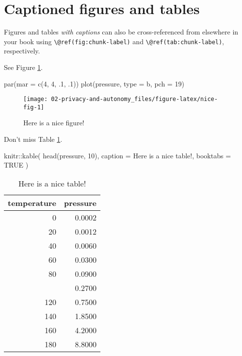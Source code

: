 \documentclass[
]{book}
\newenvironment{Shaded}{\begin{snugshade}}{\end{snugshade}}
\newcommand{\AttributeTok}[1]{\textcolor[rgb]{0.77,0.63,0.00}{#1}}
\newcommand{\ConstantTok}[1]{\textcolor[rgb]{0.00,0.00,0.00}{#1}}
\newcommand{\DecValTok}[1]{\textcolor[rgb]{0.00,0.00,0.81}{#1}}
\newcommand{\FunctionTok}[1]{\textcolor[rgb]{0.00,0.00,0.00}{#1}}
\newcommand{\NormalTok}[1]{#1}
\newcommand{\SpecialCharTok}[1]{\textcolor[rgb]{0.00,0.00,0.00}{#1}}
\newcommand{\StringTok}[1]{\textcolor[rgb]{0.31,0.60,0.02}{#1}}
\theoremstyle{definition}
\theoremstyle{definition}
\theoremstyle{definition}
\theoremstyle{definition}
\theoremstyle{remark}
\begin{document}
\hypertarget{captioned-figures-and-tables}{%
\section{Captioned figures and tables}\label{captioned-figures-and-tables}}

Figures and tables \emph{with captions} can also be cross-referenced from elsewhere in your book using \texttt{\textbackslash{}@ref(fig:chunk-label)} and \texttt{\textbackslash{}@ref(tab:chunk-label)}, respectively.

See Figure \ref{fig:nice-fig}.

\begin{Shaded}
\begin{Highlighting}[]
\FunctionTok{par}\NormalTok{(}\AttributeTok{mar =} \FunctionTok{c}\NormalTok{(}\DecValTok{4}\NormalTok{, }\DecValTok{4}\NormalTok{, .}\DecValTok{1}\NormalTok{, .}\DecValTok{1}\NormalTok{))}
\FunctionTok{plot}\NormalTok{(pressure, }\AttributeTok{type =} \StringTok{\textquotesingle{}b\textquotesingle{}}\NormalTok{, }\AttributeTok{pch =} \DecValTok{19}\NormalTok{)}
\end{Highlighting}
\end{Shaded}

\begin{figure}

{\centering \texttt{[image: 02-privacy-and-autonomy\_files/figure-latex/nice-fig-1]} 

}

\caption{Here is a nice figure!}\label{fig:nice-fig}
\end{figure}

Don't miss Table \ref{tab:nice-tab}.

\begin{Shaded}
\begin{Highlighting}[]
\NormalTok{knitr}\SpecialCharTok{::}\FunctionTok{kable}\NormalTok{(}
  \FunctionTok{head}\NormalTok{(pressure, }\DecValTok{10}\NormalTok{), }\AttributeTok{caption =} \StringTok{\textquotesingle{}Here is a nice table!\textquotesingle{}}\NormalTok{,}
  \AttributeTok{booktabs =} \ConstantTok{TRUE}
\NormalTok{)}
\end{Highlighting}
\end{Shaded}

\begin{table}

\caption{\label{tab:nice-tab}Here is a nice table!}
\centering
\begin{tabular}[t]{rr}
\toprule
temperature & pressure\\
\midrule
0 & 0.0002\\
20 & 0.0012\\
40 & 0.0060\\
60 & 0.0300\\
80 & 0.0900\\
\addlinespace
100 & 0.2700\\
120 & 0.7500\\
140 & 1.8500\\
160 & 4.2000\\
180 & 8.8000\\
\bottomrule
\end{tabular}
\end{table}
\end{document}
